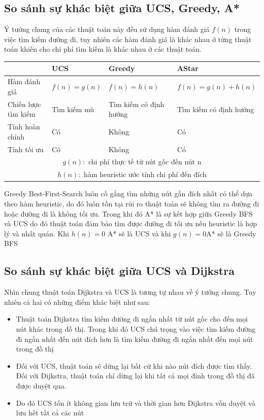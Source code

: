 \documentclass{article}
\begin{document}
\subsection{So sánh sự khác biệt giữa UCS, Greedy, A*}
\hspace{0.5in} Ý tưởng chung của các thuật toán này đều sử dụng hàm đánh giá $f(n)$ trong việc tìm kiếm đường đi, tuy nhiên các hàm đánh giá là khác nhau ở từng thuật toán khiến cho chi phí tìm kiếm là khác nhau ở các thuật toán.\\
\begin{table}[h!]
    \centering
    
    \begin{tabular}{ |p{2.5cm}|p{3cm}|p{3cm}|p{3cm}|  }\hline
    &   \textbf{UCS}    &  \textbf{Greedy}  &   \textbf{AStar}\\  
    \hline
    Hàm đánh giá&$f(n) = g(n)$&$f(n) = h(n)$&$f(n) = g(n) + h(n)$\\ \hline
    Chiến lược tìm kiếm&Tìm kiếm mù&Tìm kiếm có định hướng&Tìm kiếm có định hướng\\ \hline
    Tính hoàn chỉnh& Có&Không&Có \\ \hline
    Tính tối ưu&Có& Không& Có \\ \hline
    \multicolumn{4}{c}{\footnotesize $g(n):$ chi phí thực tế từ nút gốc đến nút n}\\
    \multicolumn{4}{c}{\footnotesize $h(n):$ hàm heuristic ước tính chi phí đến đích}\\
    \end{tabular}
\end{table}

\hspace{0.5in} Greedy Best-First-Search luôn cố gắng tìm những nút gần đích nhất có thể dựa theo hàm heuristic, do đó luôn tồn tại rủi ro thuật toán sẽ không tìm ra đường đi hoặc đường đi là không tối ưu. Trong khi đó A* là sự kết hợp giữa Greedy BFS và UCS do đó thuật toán đảm bảo tìm được đường đi tối ưu nếu heuristic là hợp lý và nhất quán. Khi $h(n) = 0$ A* sẽ là UCS và khi $g(n) = 0$A* sẽ là Greedy BFS
\subsection{So sánh sự khác biệt giữa UCS và Dijkstra}
\hspace{0.5in} Nhìn chung thuật toán Dijkstra và UCS là tương tự nhau về ý tưởng chung. Tuy nhiên cả hai có những điểm khác biệt như sau:
\begin{itemize}
    \item Thuật toán Dijkstra tìm kiếm đường đi ngắn nhất từ nút gốc cho đến mọi nút khác trong đồ thị. Trong khi đó UCS chú trọng vào việc tìm kiếm đường đi ngắn nhất đến nút đích hơn là tìm kiếm đường đi ngắn nhất đến mọi nút trong đồ thị
    \item Đối với UCS, thuật toán sẽ dừng lại bất cứ khi nào nút đích được tìm thấy. Đối với Dijkstra, thuật toán chỉ dừng lại khi tất cả mọi đỉnh trong đồ thị đã được duyệt qua.
    \item Do đó UCS tốn ít không gian lưu trữ và thời gian hơn Dijkstra vốn duyệt và lưu hết tất cả các nút
\end{itemize}
\end{document}
